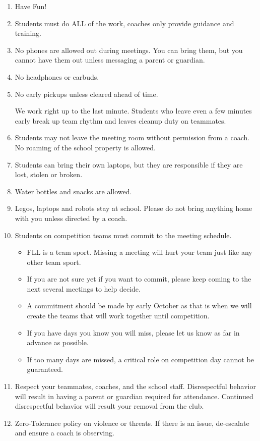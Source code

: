 \documentclass[letter]{article}
\begin{document}
\begin{enumerate}
  \item Have Fun!
  \item Students must do ALL of the work, coaches only provide guidance and training.
  \item No phones are allowed out during meetings.  You can bring them, but you cannot have them out unless messaging a parent or guardian.
  \item No headphones or earbuds.
  \item No early pickups unless cleared ahead of time.

      We work right up to the last minute.  Students who leave even a few minutes early break up team rhythm and leaves cleanup duty on teammates.

  \item Students may not leave the meeting room without permission from a coach.  No roaming of the school property is allowed.
  \item Students can bring their own laptops, but they are responsible if they are lost, stolen or broken.
  \item Water bottles and snacks are allowed.
  \item Legos, laptops and robots stay at school.  Please do not bring anything home with you unless directed by a coach.
  \item Students on competition teams must commit to the meeting schedule.

    \begin{itemize}
      \item FLL is a team sport. Missing a meeting will hurt your team just like any other team sport.
      \item If you are not sure yet if you want to commit, please keep coming to the next several meetings to help decide.
      \item A commitment should be made by early October as that is when we will create the teams that will work together until competition.
      \item If you have days you know you will miss, please let us know as far in advance as possible.
      \item If too many days are missed, a critical role on competition day cannot be guaranteed.
    \end{itemize}

  \item Respect your teammates, coaches, and the school staff.  Disrespectful behavior will result in having a parent or guardian required for attendance.  Continued disrespectful behavior will result your removal from the club.
  \item Zero-Tolerance policy on violence or threats.  If there is an issue, de-escalate and ensure a coach is observing.
\end{enumerate}
\end{document}
